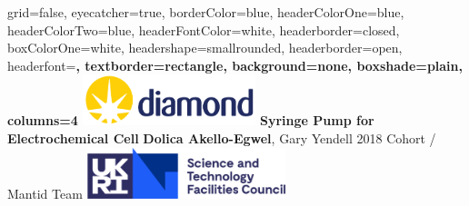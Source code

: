 \documentclass[a0paper,landscape,fontscale=0.32]{baposter}
\begin{document}


\begin{poster}{
	grid=false,
	eyecatcher=true,
	borderColor=blue,
	headerColorOne=blue,
	headerColorTwo=blue,
	headerFontColor=white,
	headerborder=closed,
	boxColorOne=white,
	headershape=smallrounded,
	headerborder=open,
	headerfont=\Large\sf\bf,
	textborder=rectangle,
	background=none,
    boxshade=plain,
    columns=4
}
{\includegraphics[height=4em]{images/diamondlogo}}
{\bf \color{blue} Syringe Pump for Electrochemical Cell \vspace{0.5em}} %
{\textbf{Dolica Akello-Egwel}, Gary Yendell \hspace{12pt} 2018 Cohort / Mantid Team} %
{\includegraphics[height=4em]{images/stfclogo}}


\end{poster}
\end{document}
